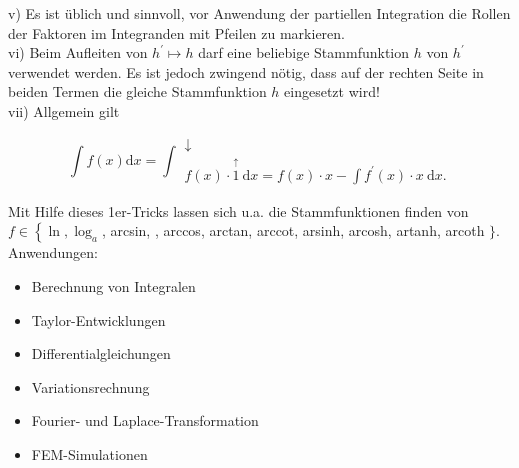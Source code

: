 \documentclass[10pt]{article}
\begin{document}
v) Es ist üblich und sinnvoll, vor Anwendung der partiellen Integration die Rollen der Faktoren im Integranden mit Pfeilen zu markieren.\\
vi) Beim Aufleiten von $h^{\prime} \mapsto h$ darf eine beliebige Stammfunktion $h$ von $h^{\prime}$ verwendet werden. Es ist jedoch zwingend nötig, dass auf der rechten Seite in beiden Termen die gleiche Stammfunktion $h$ eingesetzt wird!\\
vii) Allgemein gilt

\[
\int f(x) \mathrm{d} x=\int \begin{gather*}
\downarrow  \tag{3.28}\\
f(x) \cdot \stackrel{\uparrow}{1} \mathrm{~d} x=f(x) \cdot x-\int f^{\prime}(x) \cdot x \mathrm{~d} x .
\end{gather*}
\]

Mit Hilfe dieses 1er-Tricks lassen sich u.a. die Stammfunktionen finden von\\
$f \in\left\{\ln , \log _{a}\right.$, arcsin, , arccos, arctan, arccot, arsinh, arcosh, artanh, arcoth $\}$.\\
Anwendungen:

\begin{itemize}
  \item Berechnung von Integralen
  \item Taylor-Entwicklungen
  \item Differentialgleichungen
  \item Variationsrechnung
  \item Fourier- und Laplace-Transformation
  \item FEM-Simulationen
\end{itemize}
\end{document}
